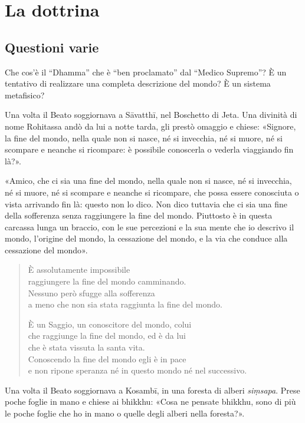 \chapter{La dottrina}

\hypertarget{x-questioni-varie}{\section*{Questioni varie}}
 Che cos’è il “Dhamma” che è “ben proclamato” dal
“Medico Supremo”? È un tentativo di realizzare una completa descrizione
del mondo? È un sistema metafisico?


 Una volta il Beato soggiornava a Sāvatthī, nel Boschetto di
Jeta. Una divinità di nome Rohitassa andò da lui a notte tarda, gli
prestò omaggio e chiese: «Signore, la fine del mondo, nella quale non si
nasce, né si invecchia, né si muore, né si scompare e neanche si
ricompare: è possibile conoscerla o vederla viaggiando fin là?».


«Amico, che ci sia una fine del mondo, nella quale non si nasce, né si
invecchia, né si muore, né si scompare e neanche si ricompare, che possa
essere conosciuta o vista arrivando fin là: questo non lo dico. Non dico
tuttavia che ci sia una fine della sofferenza senza raggiungere la fine
del mondo. Piuttosto è in questa carcassa lunga un braccio, con le sue
percezioni e la sua mente che io descrivo il mondo, l’origine del mondo,
la cessazione del mondo, e la via che conduce alla cessazione del
mondo».


\begin{quote}
È assolutamente impossibile \\
raggiungere la fine del mondo camminando. \\
Nessuno però sfugge alla sofferenza \\
a meno che non sia stata raggiunta la fine del mondo.


È un Saggio, un conoscitore del mondo, colui \\
che raggiunge la fine del mondo, ed è da lui \\
che è stata vissuta la santa vita. \\
Conoscendo la fine del mondo egli è in pace \\
e non ripone speranza né in questo mondo né nel successivo.
\end{quote}



Una volta il Beato soggiornava a Kosambī, in una foresta di alberi
\emph{siṃsapa}. Prese poche foglie in mano e chiese ai bhikkhu: «Cosa ne
pensate bhikkhu, sono di più le poche foglie che ho in mano o quelle
degli alberi nella foresta?».


